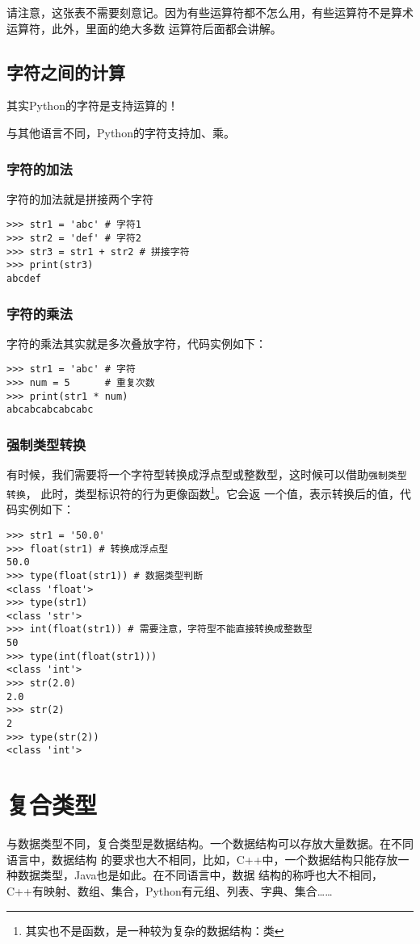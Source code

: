 \documentclass{book}
\begin{document}
请注意，这张表不需要刻意记。因为有些运算符都不怎么用，有些运算符不是算术运算符，此外，里面的绝大多数
运算符后面都会讲解。
\section{字符之间的计算}
\indent 其实Python的字符是支持运算的！


与其他语言不同，Python的字符支持加、乘。
\subsection{字符的加法}
\indent 字符的加法就是拼接两个字符


\begin{verbatim}
>>> str1 = 'abc' # 字符1
>>> str2 = 'def' # 字符2
>>> str3 = str1 + str2 # 拼接字符
>>> print(str3)
abcdef
\end{verbatim}
\subsection{字符的乘法}
\indent 字符的乘法其实就是多次叠放字符，代码实例如下：

\begin{verbatim}
>>> str1 = 'abc' # 字符
>>> num = 5      # 重复次数
>>> print(str1 * num)
abcabcabcabcabc
\end{verbatim}

\subsection{强制类型转换}
\indent 有时候，我们需要将一个字符型转换成浮点型或整数型，这时候可以借助\verb|强制类型转换|，
此时，类型标识符的行为更像函数\footnote{其实也不是函数，是一种较为复杂的数据结构：类}。它会返
一个值，表示转换后的值，代码实例如下：

\begin{verbatim}
>>> str1 = '50.0'
>>> float(str1) # 转换成浮点型
50.0
>>> type(float(str1)) # 数据类型判断
<class 'float'>
>>> type(str1)
<class 'str'>
>>> int(float(str1)) # 需要注意，字符型不能直接转换成整数型
50
>>> type(int(float(str1)))
<class 'int'>
>>> str(2.0)
2.0
>>> str(2)
2
>>> type(str(2))
<class 'int'>
\end{verbatim}
\chapter{复合类型}
\indent 与数据类型不同，复合类型是数据结构。一个数据结构可以存放大量数据。在不同语言中，数据结构
的要求也大不相同，比如，C++中，一个数据结构只能存放一种数据类型，Java也是如此。在不同语言中，数据
结构的称呼也大不相同，C++有映射、数组、集合，Python有元组、列表、字典、集合……
\end{document}
